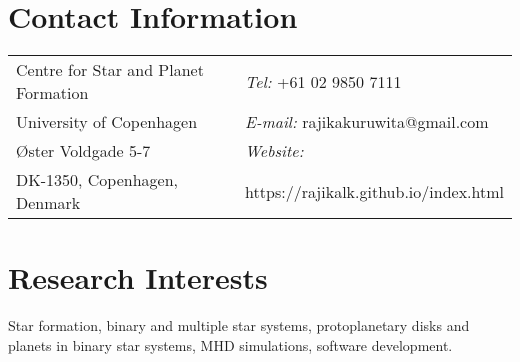 \documentclass[margin,line]{res}
\begin{document}
	
	\begin{resume}
		\section{\sc Contact Information}
		\vspace{.05in}
		\begin{tabular}{@{}p{3in}p{4in}}
			Centre for Star and Planet Formation  & {\it Tel:}    +61 02 9850 7111 \\         
			University of Copenhagen & {\it E-mail:}  rajikakuruwita@gmail.com\\ 
			Øster Voldgade 5-7 &{\it Website:} \\   
			DK-1350, Copenhagen, Denmark  &  https://rajikalk.github.io/index.html \\     
		\end{tabular}
		
		\section{\sc Research Interests}
		Star formation, binary and multiple star systems, protoplanetary disks and planets in binary star systems, MHD simulations, software development.
		

\end{resume}
\end{document}
